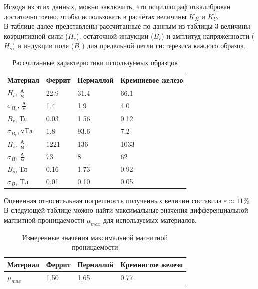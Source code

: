 \documentclass[12pt, letterpaper, oneside]{article}
\begin{document}
Исходя из этих данных, можно заключить, что осциллограф откалиброван достаточно точно, чтобы использовать в расчётах величины $K_X$ и $K_Y$.\\
В таблице далее представлены рассчитанные по данным из таблицы 3 величины коэрцитивной силы ($H_c$), остаточной индукции ($B_r$) и амплитуд напряжённости ($H_s$) и индукции поля ($B_s$) для предельной петли гистерезиса каждого образца.\\
\begin{table}[H]
\centering
\caption{Рассчитанные характеристики используемых образцов}
\begin{tabular}{|l|l|l|l|}
\hline
Материал                & Феррит & Пермаллой & Кремниевое железо \\ \hline
$H_c$, $\frac{А}{м}$ & 22.9   & 31.4       & 66.1              \\ \hline
$\sigma_{H_c}$, $\frac{А}{м}$    & 1.4    & 1.9       & 4.0              \\ \hline
$B_r$, Тл    & 0.03    & 1.56       & 0.12              \\ \hline
$\sigma_{B_r}, мТл$    & 1.8    & 93.6       & 7.2              \\ \hline
$H_{s}$, $\frac{А}{м}$ & 1221   & 136       & 1033              \\ \hline
$\sigma_H$, $\frac{А}{м}$    & 73    & 8       & 62              \\ \hline
$B_{s}$, Тл    & 0.16    & 1.73       & 0.92              \\ \hline
$\sigma_B$, Tл    & 0.01    & 0.10       & 0.05              \\ \hline
\end{tabular}
\end{table}\noindent
Оцененная относительная погрешность полученных величин составила $\varepsilon ≈ 11\%$\\
В следующей таблице можно найти максимальные значения дифференциальной магнитной проницаемости $\mu_{max}$ для используемых материалов.\\
\begin{table}[H]
\caption{Измеренные значения максимальной магнитной проницаемости}
\centering
\begin{tabular}{|l|l|l|l|}
\hline
Материал & Феррит & Пермаллой & Кремнистое железо \\
\hline
$\mu_{max}$ & 1.50 & 1.65 & 0.77 \\
\hline
\end{tabular}
\end{table}\noindent
\end{document}
